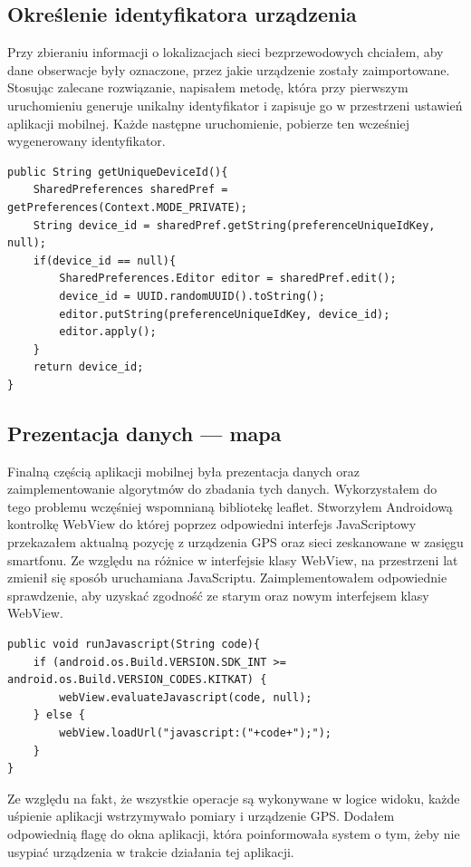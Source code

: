 \subsection{Określenie identyfikatora urządzenia}
Przy zbieraniu informacji o lokalizacjach sieci bezprzewodowych chciałem, aby dane obserwacje były oznaczone, przez jakie urządzenie zostały zaimportowane. Stosując zalecane rozwiązanie, napisałem metodę, która przy pierwszym uruchomieniu generuje unikalny identyfikator i zapisuje go w przestrzeni ustawień aplikacji mobilnej. Każde następne uruchomienie, pobierze ten wcześniej wygenerowany identyfikator.\cite{SOSharedPrefreneces}
\begin{verbatim}
public String getUniqueDeviceId(){
    SharedPreferences sharedPref = getPreferences(Context.MODE_PRIVATE);
    String device_id = sharedPref.getString(preferenceUniqueIdKey, null);
    if(device_id == null){
        SharedPreferences.Editor editor = sharedPref.edit();
        device_id = UUID.randomUUID().toString();
        editor.putString(preferenceUniqueIdKey, device_id);
        editor.apply();
    }
    return device_id;
}
\end{verbatim}

\subsection{Prezentacja danych — mapa}
Finalną częścią aplikacji mobilnej była prezentacja danych oraz zaimplementowanie algorytmów do zbadania tych danych. Wykorzystałem do tego problemu wczęśniej wspomnianą bibliotekę leaflet. Stworzyłem Androidową kontrolkę WebView do której poprzez odpowiedni interfejs JavaScriptowy przekazałem aktualną pozycję z urządzenia GPS oraz sieci zeskanowane w zasięgu smartfonu. Ze względu na różnice w interfejsie klasy WebView, na przestrzeni lat zmienił się sposób uruchamiana JavaScriptu. Zaimplementowałem odpowiednie sprawdzenie, aby uzyskać zgodność ze starym oraz nowym interfejsem klasy WebView.

\begin{verbatim}
public void runJavascript(String code){
    if (android.os.Build.VERSION.SDK_INT >= android.os.Build.VERSION_CODES.KITKAT) {
        webView.evaluateJavascript(code, null);
    } else {
        webView.loadUrl("javascript:("+code+");");
    }
}
\end{verbatim}

Ze względu na fakt, że wszystkie operacje są wykonywane w logice widoku, każde uśpienie aplikacji wstrzymywało pomiary i urządzenie GPS. Dodałem odpowiednią flagę do okna aplikacji, która poinformowała system o tym, żeby nie usypiać urządzenia w trakcie działania tej aplikacji.

